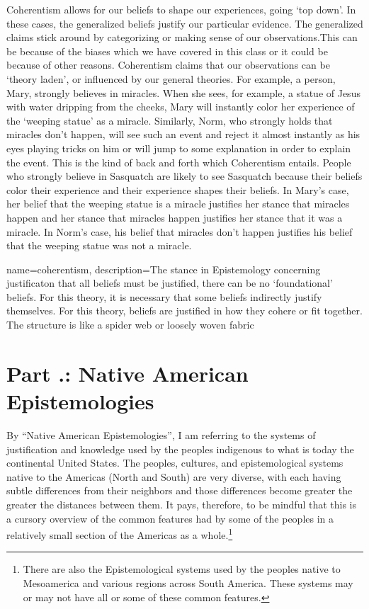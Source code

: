 Coherentism allows for our beliefs to shape our experiences, going `top down'. In these cases, the generalized beliefs justify our particular evidence. The generalized claims stick around by categorizing or making sense of our observations.This can be because of the biases which we have covered in this class or it could be because of other reasons. Coherentism claims that our observations can be `theory laden', or influenced by our general theories. For example, a person, Mary, strongly believes in miracles. When she sees, for example, a statue of Jesus with water dripping from the cheeks, Mary will instantly color her experience of the `weeping statue' as a miracle. Similarly, Norm, who strongly holds that miracles don't happen, will see such an event and reject it almost instantly as his eyes playing tricks on him or will jump to some explanation in order to explain the event. This is the kind of back and forth which Coherentism entails. People who strongly believe in Sasquatch are likely to see Sasquatch because their beliefs color their experience and their experience shapes their beliefs. In Mary's case, her belief that the weeping statue is a miracle justifies her stance that miracles happen and her stance that miracles happen justifies her stance that it was a miracle. In Norm's case, his belief that miracles don't happen justifies his belief that the weeping statue was not a miracle. 


{
name=coherentism,
description={The stance in Epistemology concerning justificaton that all beliefs must be justified, there can be no `foundational' beliefs. For this theory, it is necessary that some beliefs indirectly justify themselves. For this theory, beliefs are justified in how they cohere or fit together. The structure is like a spider web or loosely woven fabric}
}


\section{Part \thechapcount.\theseccount: Native American Epistemologies}
By ``Native American Epistemologies'', I am referring to the systems of justification and knowledge used by the peoples indigenous to what is today the continental United States. The peoples, cultures, and epistemological systems native to the Americas (North and South) are very diverse, with each having subtle differences from their neighbors and those differences become greater the greater the distances between them. It pays, therefore, to be mindful that this is a cursory overview of the common features had by some of the peoples in a relatively small section of the Americas as a whole.\footnote{There are also the Epistemological systems used by the peoples native to Mesoamerica and various regions across South America. These systems may or may not have all or some of these common features.}  

